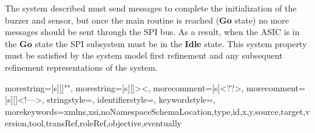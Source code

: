 The system described must send messages to complete the initialization of the buzzer and sensor, but once the main routine is reached (\textbf{Go} state) no more messages should be sent through the SPI bus. As a result, when the ASIC is in the \textbf{Go} state the SPI subsystem must be in the \textbf{Idle} state. This system property must be satisfied by the system model first refinement and any subsequent refinement representations of the system.

 




{
  morestring=[s][\color{mauve}]{"}{"},
  morestring=[s][\color{black}]{>}{<},
  morecomment=[s]{<?}{?>},
  morecomment=[s][\color{dkgreen}]{<!--}{-->},
  stringstyle=\color{black},
  identifierstyle=\color{lightblue},
  keywordstyle=\color{red},
  morekeywords={xmlns,xsi,noNamespaceSchemaLocation,type,id,x,y,source,target,version,tool,transRef,roleRef,objective,eventually}%
}

